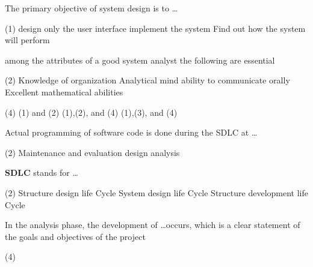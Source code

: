 \documentclass[10pt]{article}
\begin{document}
\begin{questions}
\begin{exercise}
    \end{exercise}
    \begin{exercise}
        The primary objective of system design is to \dots
        \begin{choice}(1)
            \choice {}
            \choice design only the user interface
            \choice implement the system
            \choice Find out how the system will perform
        \end{choice}
    \end{exercise}
    \begin{exercise}
        among the attributes of a good system analyst the following are essential
        \begin{tasks}(2)
            \task Knowledge of organization
            \task Analytical mind
            \task ability to communicate orally
            \task Excellent mathematical abilities
        \end{tasks}
        \begin{choice}(4)
            \choice (1) and (2)
            \choice {}
            \choice (1),(2), and (4)
            \choice (1),(3), and (4)
        \end{choice}
    \end{exercise}
    \begin{exercise}
        Actual programming of software code is done during the SDLC at \dots
        \begin{choice}(2)
            \choice Maintenance and evaluation
            \choice design
            \choice analysis
            \choice {}
        \end{choice}
    \end{exercise}
    \begin{exercise}
        \textbf{SDLC} stands for \dots
        \begin{choice}(2)
            \choice {}
            \choice Structure design life Cycle
            \choice System design life Cycle
            \choice Structure development life Cycle
        \end{choice}
    \end{exercise}
    \begin{exercise}
        In the analysis phase, the development of \dots occurs, which is a clear statement of the goals and objectives of the project
        \begin{choice}(4)

\end{choice}
\end{exercise}
\end{questions}
\end{document}
